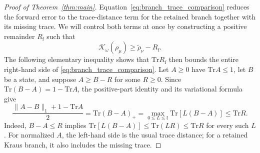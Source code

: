 \documentclass[a4paper,onecolumn,11pt]{quantumarticle}
\def\id{\mathbb{I}}
\newcommand*{\Tr}{\mathrm{Tr}}
\begin{document}
\begin{proof}[Proof of Theorem~\ref{thm:main}]
Equation~\eqref{eq:branch_trace_comparison} reduces the forward error
to the trace-distance term for the retained branch together with its
missing trace. We will control both terms at once by constructing
a positive remainder $R_{\mathrm f}$ such that
\[
\mathcal K_\omega(\rho_\mu)\ge\widetilde\rho_\nu-R_{\mathrm f}.
\]
The following elementary inequality shows that $\Tr R_{\mathrm f}$
then bounds the entire right-hand side of
\eqref{eq:branch_trace_comparison}. Let
$A\ge0$ have $\Tr A\le1$, let $B$ be a state, and suppose
$A\ge B-R$ for some $R\ge0$. Since
$\Tr(B-A)=1-\Tr A$, the positive-part identity and its variational
formula give
\begin{equation}\label{eq:positive_deficit_trace}
\frac{\|A-B\|_1+1-\Tr A}{2}
=\Tr(B-A)_+
=\max_{0\le L\le\id}\Tr[L(B-A)]\le\Tr R.
\end{equation}
Indeed, $B-A\le R$ implies
$\Tr[L(B-A)]\le\Tr(LR)\le\Tr R$ for every such $L$.
For normalized $A$, the left-hand side is the usual trace distance;
for a retained Kraus branch, it also includes the missing trace.


\end{proof}
\end{document}
